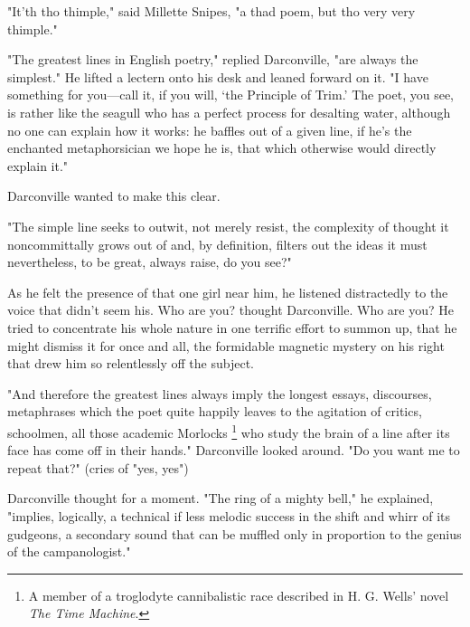   "It'th tho thimple," said Millette Snipes, "a thad poem, but tho very very
thimple."

  "The greatest lines in English poetry," replied Darconville, "are always the
simplest." He lifted a lectern onto his desk and leaned forward on it. "I have
something for you---call it, if you will, `the Principle of Trim.' The poet, you
see, is rather like the seagull who has a perfect process for desalting water,
although no one can explain how it works: he baffles out of a given line, if
he's the enchanted metaphorsician we hope he is, that which otherwise would
directly explain it."

  Darconville wanted to make this clear.

  "The simple line seeks to outwit, not merely resist, the complexity of thought
it noncommittally grows out of and, by definition, filters out the ideas it must
nevertheless, to be great, always raise, do you see?"

  As he felt the presence of that one girl near him, he listened distractedly to
the voice that didn't seem his. Who are you? thought Darconville. Who are you?
He tried to concentrate his whole nature in one terrific effort to summon up,
that he might dismiss it for once and all, the formidable magnetic mystery on
his right that drew him so relentlessly off the subject.

  "And therefore the greatest lines always imply the longest essays, discourses,
metaphrases which the poet quite happily leaves to the agitation of critics,
schoolmen, all those academic Morlocks 
\footnote{ A member of a troglodyte cannibalistic race described in H. G. Wells'
  novel \textit{The Time Machine}.}
who study the brain of a line after its
face has come off in their hands." Darconville looked around. "Do you want me to
repeat that?" (cries of "yes, yes")

  Darconville thought for a moment. "The ring of a mighty bell," he explained,
"implies, logically, a technical if less melodic success in the shift and whirr
of its gudgeons, 
a secondary sound that can be muffled 
only in proportion to the genius of the campanologist."


